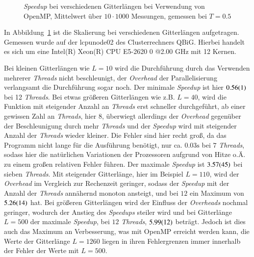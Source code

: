 	\begin{figure}[htbp]
		
		\caption[\textit{Speedup} bei verschiedenen Gitterlängen bei Verwendung von OpenMP]{\textit{Speedup}  bei verschiedenen Gitterlängen bei Verwendung von OpenMP, Mittelwert über $10 \cdot 1000$ Messungen, gemessen bei $T=\num{0,5}$}
		\label{fig:skalierunglaenge}
	\end{figure}
	
	In Abbildung~\ref{fig:skalierunglaenge} ist die Skalierung bei verschiedenen Gitterlängen aufgetragen. Gemessen wurde auf der lcpunode02 des Clusterrechners QBiG. Hierbei handelt es sich um eine Intel(R) Xeon(R) CPU E5-2620 0 @2.00 GHz mit 12 Kernen.%
	
	Bei kleinen Gitterlängen wie $L=10$ wird die Durchführung durch das Verwenden mehrerer \textit{Threads} nicht beschleunigt, der \textit{Overhead} der Parallelisierung verlangsamt die Durchführung sogar noch. Der minimale \textit{Speedup} ist hier $\num{0,56\pm0,01}$ bei 12 \textit{Threads}. Bei etwas größeren Gitterlängen wie z.{}B.{} $L=40$, wird die Funktion mit steigender Anzahl an \textit{Threads} erst schneller durchgeführt, ab einer gewissen Zahl an \textit{Threads}, hier $8$, überwiegt allerdings der \textit{Overhead} gegenüber der Beschleunigung durch mehr \textit{Threads} und der \textit{Speedup} wird mit steigender Anzahl der \textit{Threads} wieder kleiner. Die Fehler sind hier recht groß, da das Programm nicht lange für die Ausführung benötigt, nur ca.{} $\num{0,03}\si{\second}$ bei $7$ \textit{Threads}, sodass hier die natürlichen Variationen der Prozessoren aufgrund von Hitze o.{}Ä.{} zu einem großen relativen Fehler führen. Der maximale \textit{Speedup} ist $\num{3,57\pm0,45}$ bei sieben \textit{Threads}. Mit steigender Gitterlänge, hier im Beispiel $L=110$, wird der \textit{Overhead} im Vergleich zur Rechenzeit geringer, sodass der \textit{Speedup} mit der Anzahl der \textit{Threads} annähernd monoton ansteigt, und bei $12$ ein Maximum von $\num{5,26\pm0,14}$ hat.
	Bei größeren Gitterlängen wird der Einfluss der \textit{Overheads} nochmal geringer, wodurch der Anstieg des \textit{Speedups} steiler wird und bei Gitterlänge $L=500$ der maximale \textit{Speedup}, bei $12$ \textit{Threads}, $\num{5,99\pm0,12}$ beträgt. Jedoch ist dies auch das Maximum an Verbesserung, was mit OpenMP erreicht werden kann, die Werte der Gitterlänge $L=1260$ liegen in ihren Fehlergrenzen immer innerhalb der Fehler der Werte mit $L=500$.
 	
	
